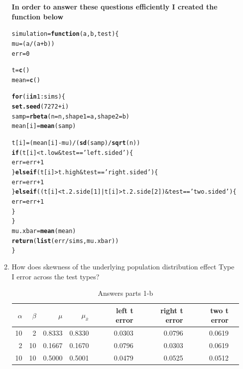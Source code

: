 \documentclass{article}\usepackage[]{graphicx}\usepackage[]{xcolor}
\makeatletter
\newcommand{\hlnum}[1]{\textcolor[rgb]{0.686,0.059,0.569}{#1}}%
\newcommand{\hlsng}[1]{\textcolor[rgb]{0.192,0.494,0.8}{#1}}%
\newcommand{\hlopt}[1]{\textcolor[rgb]{0,0,0}{#1}}%
\newcommand{\hldef}[1]{\textcolor[rgb]{0.345,0.345,0.345}{#1}}%
\newcommand{\hlkwa}[1]{\textcolor[rgb]{0.161,0.373,0.58}{\textbf{#1}}}%
\newcommand{\hlkwb}[1]{\textcolor[rgb]{0.69,0.353,0.396}{#1}}%
\newcommand{\hlkwc}[1]{\textcolor[rgb]{0.333,0.667,0.333}{#1}}%
\newcommand{\hlkwd}[1]{\textcolor[rgb]{0.737,0.353,0.396}{\textbf{#1}}}%
\newenvironment{kframe}{%
 \def\at@end@of@kframe{}%
 \ifinner\ifhmode%
  \def\at@end@of@kframe{\end{minipage}}%
  \begin{minipage}{\columnwidth}%
 \fi\fi%
 \def\FrameCommand##1{\hskip\@totalleftmargin \hskip-\fboxsep
 \colorbox{shadecolor}{##1}\hskip-\fboxsep
     \hskip-\linewidth \hskip-\@totalleftmargin \hskip\columnwidth}%
 \MakeFramed {\advance\hsize-\width
   \@totalleftmargin\z@ \linewidth\hsize
   \@setminipage}}%
 {\par\unskip\endMakeFramed%
 \at@end@of@kframe}
\newenvironment{knitrout}{}{} %
\makeatother
\begin{document}
\begin{enumerate}
\begin{enumerate}
    \textbf{In order to answer these questions efficiently I created the function below}
\begin{knitrout}
\color{fgcolor}\begin{kframe}
\begin{alltt}
\hldef{simulation} \hlkwb{=} \hlkwa{function}\hldef{(}\hlkwc{a}\hldef{,} \hlkwc{b}\hldef{,} \hlkwc{test}\hldef{)\{}
  \hldef{mu} \hlkwb{=} \hldef{(a}\hlopt{/}\hldef{(a}\hlopt{+}\hldef{b))}
  \hldef{err} \hlkwb{=} \hlnum{0}

  \hldef{t} \hlkwb{=} \hlkwd{c}\hldef{()}
  \hldef{mean} \hlkwb{=} \hlkwd{c}\hldef{()}

  \hlkwa{for} \hldef{(i} \hlkwa{in} \hlnum{1}\hlopt{:}\hldef{sims)\{}
    \hlkwd{set.seed}\hldef{(}\hlnum{7272}\hlopt{+}\hldef{i)}
    \hldef{samp} \hlkwb{=} \hlkwd{rbeta}\hldef{(}\hlkwc{n} \hldef{= n,} \hlkwc{shape1} \hldef{= a,} \hlkwc{shape2} \hldef{= b)}
    \hldef{mean[i]} \hlkwb{=} \hlkwd{mean}\hldef{(samp)}

    \hldef{t[i]} \hlkwb{=} \hldef{(mean[i]}\hlopt{-}\hldef{mu)}\hlopt{/}\hldef{(}\hlkwd{sd}\hldef{(samp)}\hlopt{/}\hlkwd{sqrt}\hldef{(n))}
    \hlkwa{if} \hldef{(t[i]} \hlopt{<} \hldef{t.low} \hlopt{&} \hldef{test} \hlopt{==} \hlsng{'left.sided'}\hldef{)\{}
      \hldef{err} \hlkwb{=} \hldef{err} \hlopt{+} \hlnum{1}
    \hldef{\}}\hlkwa{else if} \hldef{(t[i]} \hlopt{>} \hldef{t.high} \hlopt{&} \hldef{test} \hlopt{==} \hlsng{'right.sided'}\hldef{)\{}
      \hldef{err} \hlkwb{=} \hldef{err} \hlopt{+} \hlnum{1}
    \hldef{\}}\hlkwa{else if} \hldef{((t[i]} \hlopt{<} \hldef{t.2.side[}\hlnum{1}\hldef{]} \hlopt{|} \hldef{t[i]} \hlopt{>} \hldef{t.2.side[}\hlnum{2}\hldef{])} \hlopt{&} \hldef{test} \hlopt{==} \hlsng{'two.sided'}\hldef{)\{}
      \hldef{err} \hlkwb{=} \hldef{err} \hlopt{+} \hlnum{1}
    \hldef{\}}
  \hldef{\}}
  \hldef{mu.xbar} \hlkwb{=} \hlkwd{mean}\hldef{(mean)}
  \hlkwd{return}\hldef{(}\hlkwd{list}\hldef{(err}\hlopt{/}\hldef{sims, mu.xbar))}
\hldef{\}}
\end{alltt}
\end{kframe}
\end{knitrout}
    \item How does skewness of the underlying population distribution effect
    Type I error across the test types?

\begin{table}[ht]
\centering
\begin{tabular}{rrrrrrrr}
  \hline
  $\alpha$ & $\beta$ & $\mu$ & $\mu_{\bar{x}}$ & left t error & right t error & two t error \\ 
  \hline
  10 & 2 & 0.8333 & 0.8330 & 0.0303 & 0.0796 & 0.0619 \\ 
  2 & 10 & 0.1667 & 0.1670 & 0.0796 & 0.0303 & 0.0619 \\ 
  10 & 10 & 0.5000 & 0.5001 & 0.0479 & 0.0525 & 0.0512 \\ 
   \hline
\end{tabular}
\caption{Answers parts 1-b}
\end{table}



\end{enumerate}
\end{enumerate}
\end{document}
